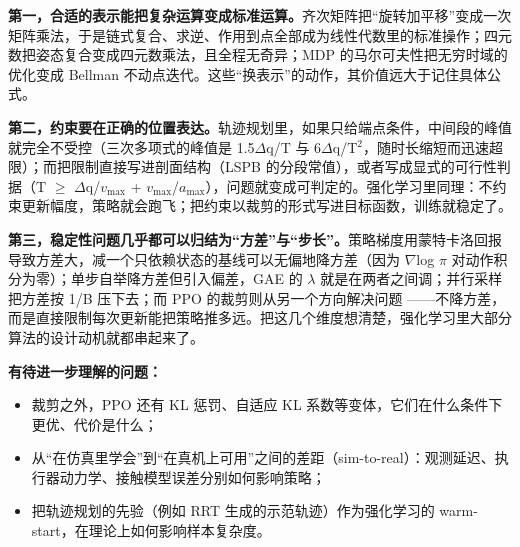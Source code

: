 \documentclass[11pt,a4paper]{ctexart}
\begin{document}
\textbf{第一，合适的表示能把复杂运算变成标准运算。}齐次矩阵把“旋转加平移”变成一次矩阵乘法，于是链式复合、求逆、作用到点全部成为线性代数里的标准操作；四元数把姿态复合变成四元数乘法，且全程无奇异；MDP 的马尔可夫性把无穷时域的优化变成 Bellman 不动点迭代。这些“换表示”的动作，其价值远大于记住具体公式。\par

\textbf{第二，约束要在正确的位置表达。}轨迹规划里，如果只给端点条件，中间段的峰值就完全不受控（三次多项式的峰值是 1.5$\Delta$q/T 与 6$\Delta$q/T$^{2}$，随时长缩短而迅速超限）；而把限制直接写进剖面结构（LSPB 的分段常值），或者写成显式的可行性判据（T $\geq$ $\Delta$q/$v_{\mathrm{max}}$ + $v_{\mathrm{max}}$/$a_{\mathrm{max}}$），问题就变成可判定的。强化学习里同理：不约束更新幅度，策略就会跑飞；把约束以裁剪的形式写进目标函数，训练就稳定了。\par

\textbf{第三，稳定性问题几乎都可以归结为“方差”与“步长”。}策略梯度用蒙特卡洛回报导致方差大，减一个只依赖状态的基线可以无偏地降方差（因为 $\nabla$log $\pi$ 对动作积分为零）；单步自举降方差但引入偏差，GAE 的 $\lambda$ 就是在两者之间调；并行采样把方差按 1/B 压下去；而 PPO 的裁剪则从另一个方向解决问题 ——不降方差，而是直接限制每次更新能把策略推多远。把这几个维度想清楚，强化学习里大部分算法的设计动机就都串起来了。\par

\textbf{有待进一步理解的问题：}\par

\begin{itemize}[leftmargin=1.6em,itemsep=0.15em,topsep=0.25em]

\item 裁剪之外，PPO 还有 KL 惩罚、自适应 KL 系数等变体，它们在什么条件下更优、代价是什么；

\item 从“在仿真里学会”到“在真机上可用”之间的差距（sim-to-real）：观测延迟、执行器动力学、接触模型误差分别如何影响策略；

\item 把轨迹规划的先验（例如 RRT 生成的示范轨迹）作为强化学习的 warm-start，在理论上如何影响样本复杂度。

\end{itemize}
\end{document}
